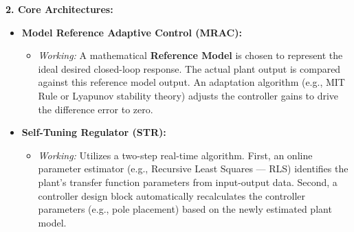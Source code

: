 \documentclass[12pt,a4paper]{article}
\begin{document}
\textbf{2. Core Architectures:}
\begin{itemize}[leftmargin=*, itemsep=2.5pt]
  \item \textbf{Model Reference Adaptive Control (MRAC):}
    \begin{itemize}[leftmargin=*, itemsep=1.5pt]
      \item \textit{Working:} A mathematical \textbf{Reference Model} is chosen to represent the ideal desired closed-loop response. The actual plant output is compared against this reference model output. An adaptation algorithm (e.g., MIT Rule or Lyapunov stability theory) adjusts the controller gains to drive the difference error to zero.
    \end{itemize}
  \item \textbf{Self-Tuning Regulator (STR):}
    \begin{itemize}[leftmargin=*, itemsep=1.5pt]
      \item \textit{Working:} Utilizes a two-step real-time algorithm. First, an online parameter estimator (e.g., Recursive Least Squares --- RLS) identifies the plant's transfer function parameters from input-output data. Second, a controller design block automatically recalculates the controller parameters (e.g., pole placement) based on the newly estimated plant model.
    \end{itemize}
\end{itemize}

\begin{tcolorbox}[tikzbox, title={Model Reference Adaptive Control (MRAC) Architecture}]
\centering
{}
\end{tcolorbox}
\end{document}

